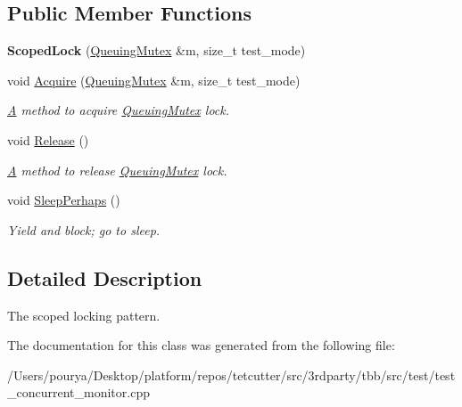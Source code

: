 \subsection*{Public Member Functions}
\begin{DoxyCompactItemize}
\item 
\hypertarget{classQueuingMutex_1_1ScopedLock_a567538a62d2f00ab72a281c6acdce342}{}{\bfseries Scoped\+Lock} (\hyperlink{classQueuingMutex}{Queuing\+Mutex} \&m, size\+\_\+t test\+\_\+mode)\label{classQueuingMutex_1_1ScopedLock_a567538a62d2f00ab72a281c6acdce342}

\item 
\hypertarget{classQueuingMutex_1_1ScopedLock_a600a34d9b604ba3d380dce946d534a86}{}void \hyperlink{classQueuingMutex_1_1ScopedLock_a600a34d9b604ba3d380dce946d534a86}{Acquire} (\hyperlink{classQueuingMutex}{Queuing\+Mutex} \&m, size\+\_\+t test\+\_\+mode)\label{classQueuingMutex_1_1ScopedLock_a600a34d9b604ba3d380dce946d534a86}

\begin{DoxyCompactList}\small\item\em \hyperlink{structA}{A} method to acquire \hyperlink{classQueuingMutex}{Queuing\+Mutex} lock. \end{DoxyCompactList}\item 
\hypertarget{classQueuingMutex_1_1ScopedLock_a8d2010cf4e61437bb59f29b691be1577}{}void \hyperlink{classQueuingMutex_1_1ScopedLock_a8d2010cf4e61437bb59f29b691be1577}{Release} ()\label{classQueuingMutex_1_1ScopedLock_a8d2010cf4e61437bb59f29b691be1577}

\begin{DoxyCompactList}\small\item\em \hyperlink{structA}{A} method to release \hyperlink{classQueuingMutex}{Queuing\+Mutex} lock. \end{DoxyCompactList}\item 
\hypertarget{classQueuingMutex_1_1ScopedLock_a3a8e5affd184849fa2d06fcab1119d41}{}void \hyperlink{classQueuingMutex_1_1ScopedLock_a3a8e5affd184849fa2d06fcab1119d41}{Sleep\+Perhaps} ()\label{classQueuingMutex_1_1ScopedLock_a3a8e5affd184849fa2d06fcab1119d41}

\begin{DoxyCompactList}\small\item\em Yield and block; go to sleep. \end{DoxyCompactList}\end{DoxyCompactItemize}


\subsection{Detailed Description}
The scoped locking pattern. 

The documentation for this class was generated from the following file\+:\begin{DoxyCompactItemize}
\item 
/\+Users/pourya/\+Desktop/platform/repos/tetcutter/src/3rdparty/tbb/src/test/test\+\_\+concurrent\+\_\+monitor.\+cpp\end{DoxyCompactItemize}

